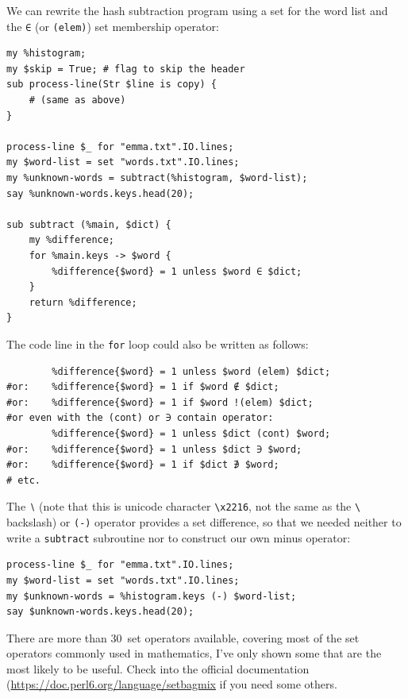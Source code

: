 We can rewrite the hash subtraction program using a set for 
the word list and the  \verb'∈' (or \verb'(elem)') 
set membership operator:

\begin{verbatim}
my %histogram;
my $skip = True; # flag to skip the header
sub process-line(Str $line is copy) {
    # (same as above)
}

process-line $_ for "emma.txt".IO.lines; 
my $word-list = set "words.txt".IO.lines;
my %unknown-words = subtract(%histogram, $word-list);
say %unknown-words.keys.head(20);

sub subtract (%main, $dict) {
	my %difference;
	for %main.keys -> $word {
		%difference{$word} = 1 unless $word ∈ $dict;
	}
	return %difference;
}
\end{verbatim}

The code line in the {\tt for} loop could also be written as follows:

\begin{verbatim}
        %difference{$word} = 1 unless $word (elem) $dict;
#or:    %difference{$word} = 1 if $word ∉ $dict;
#or:    %difference{$word} = 1 if $word !(elem) $dict;
#or even with the (cont) or ∋ contain operator:
        %difference{$word} = 1 unless $dict (cont) $word;
#or:    %difference{$word} = 1 unless $dict ∋ $word;
#or:    %difference{$word} = 1 if $dict ∌ $word;
# etc.
\end{verbatim}

The \verb'∖' (note that this is unicode character \verb'\x2216', 
not the same as the \verb'\' backslash) or \verb'(-)' operator 
provides a set difference, so that we needed neither to write a 
{\tt subtract} subroutine nor to construct our own minus operator:

\begin{verbatim}
process-line $_ for "emma.txt".IO.lines; 
my $word-list = set "words.txt".IO.lines;
my $unknown-words = %histogram.keys (-) $word-list;
say $unknown-words.keys.head(20);
\end{verbatim}

There are more than 30~set operators available, covering most of 
the set operators commonly used in mathematics, I've only shown 
some that are the most likely to be useful. Check into the 
official documentation (\url{https://doc.perl6.org/language/setbagmix} 
if you need some others.

